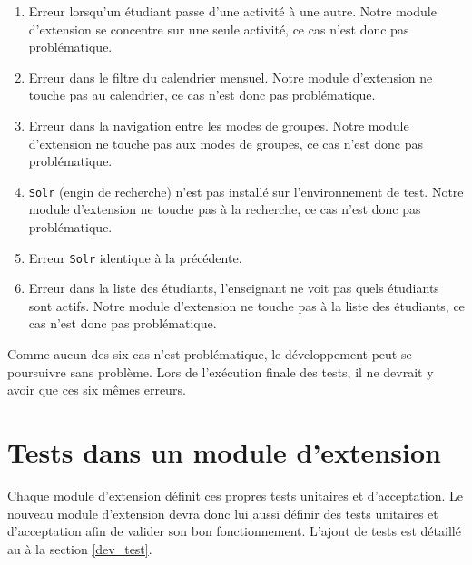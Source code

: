 \begin{enumerate}
  \item Erreur lorsqu'un \'etudiant passe d'une activit\'e \`a une autre.
        Notre module d'extension se concentre sur une seule activit\'e, ce cas n'est donc pas probl\'ematique.
        
  \item Erreur dans le filtre du calendrier mensuel.
        Notre module d'extension ne touche pas au calendrier, ce cas n'est donc pas probl\'ematique.
        
  \item Erreur dans la navigation entre les modes de groupes.
        Notre module d'extension ne touche pas aux modes de groupes, ce cas n'est donc pas probl\'ematique.
        
  \item \texttt{Solr} (engin de recherche) n'est pas install\'e sur l'environnement de test.
        Notre module d'extension ne touche pas \`a la recherche, ce cas n'est donc pas probl\'ematique.
        
  \item Erreur \texttt{Solr} identique \`a la pr\'ec\'edente.
  
  \item Erreur dans la liste des \'etudiants, l'enseignant ne voit pas quels \'etudiants sont actifs.
        Notre module d'extension ne touche pas \`a la liste des \'etudiants, ce cas n'est donc pas probl\'ematique.
\end{enumerate}
Comme aucun des six cas n'est probl\'ematique, le d\'eveloppement peut se poursuivre sans probl\`eme.
Lors de l'ex\'ecution finale des tests, il ne devrait y avoir que ces six m\^emes erreurs.
\section{Tests dans un module d'extension}
Chaque module d'extension d\'efinit ces propres tests unitaires et d'acceptation.
Le nouveau module d'extension devra donc lui aussi d\'efinir des tests unitaires et d'acceptation afin de valider son bon fonctionnement.
L'ajout de tests est d\'etaill\'e au \`a la section \ref{dev_test}.